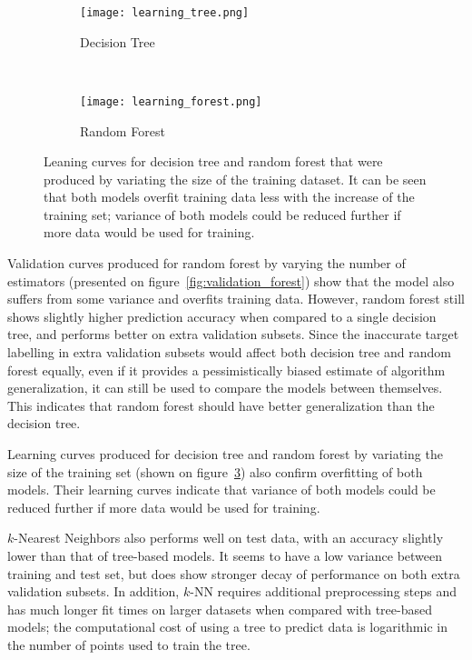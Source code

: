 \begin{figure}[hbt!]
    \centering
    \begin{subfigure}[t]{.47\textwidth}
        \centering
        \texttt{[image: learning\_tree.png]}
        \caption{Decision Tree}
        \label{fig:learning_tree}
    \end{subfigure}
    ~ %
    \begin{subfigure}[t]{.48\textwidth}
        \centering
        \texttt{[image: learning\_forest.png]}
        \caption{Random Forest}
        \label{fig:learning_forest}
    \end{subfigure}
    \caption{Leaning curves for decision tree and random forest that were produced by variating the size of the training dataset.
    It can be seen that both models overfit training data less with the increase of the training set;
    variance of both models could be reduced further if more data would be used for training.}
    \label{fig:learning_curves}
\end{figure}

Validation curves produced for random forest by varying the number of estimators (presented on figure~\ref{fig:validation_forest}) show that the model also suffers from some variance and overfits training data.
However, random forest still shows slightly higher prediction accuracy when compared to a single decision tree, and performs better on extra validation subsets.
Since the inaccurate target labelling in extra validation subsets would affect both decision tree and random forest equally, even if it provides a pessimistically biased estimate of algorithm generalization, it can still be used to compare the models between themselves\cite{Raschka2018}.
This indicates that random forest should have better generalization than the decision tree.

Learning curves produced for decision tree and random forest by variating the size of the training set (shown on figure~\ref{fig:learning_curves}) also confirm overfitting of both models.
Their learning curves indicate that variance of both models could be reduced further if more data would be used for training.

$k$-Nearest Neighbors also performs well on test data, with an accuracy slightly lower than that of tree-based models.
It seems to have a low variance between training and test set, but does show stronger decay of performance on both extra validation subsets.
In addition, $k$-NN requires additional preprocessing steps and has much longer fit times on larger datasets when compared with tree-based models;
the computational cost of using a tree to predict data is logarithmic in the number of points used to train the tree.

